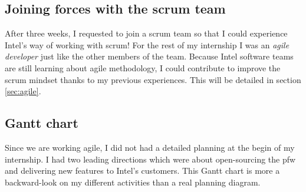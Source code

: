 \subsection{Joining forces with the scrum team}
After three weeks, I requested to join a \gls{scrum} team so that I could experience
Intel's way of working with \gls{scrum}!
For the rest of my internship I was an \emph{agile developer} just like the other members of the team.
Because Intel software teams are still learning about agile methodology, I could contribute to improve
the \gls{scrum} mindset thanks to my previous experiences. This will be detailed in section \ref{sec:agile}.

\subsection{Gantt chart}
Since we are working agile, I did not had a detailed planning at the begin of my internship.
I had two leading directions which were about open-sourcing the \gls{pfw} and delivering new features
to Intel's customers.
This Gantt chart is more a backward-look on my different activities than a real planning
diagram.




